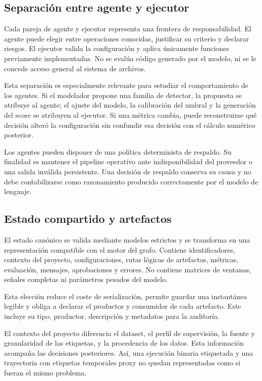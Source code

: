 \subsection{Separación entre agente y ejecutor}

Cada pareja de agente y ejecutor representa una frontera de responsabilidad. El
agente puede elegir entre operaciones conocidas, justificar su criterio y
declarar riesgos. El ejecutor valida la configuración y aplica únicamente
funciones previamente implementadas. No se evalúa código generado por el
modelo, ni se le concede acceso general al sistema de archivos.

Esta separación es especialmente relevante para estudiar el comportamiento de
los agentes. Si el modelador propone una familia de detector, la propuesta se
atribuye al agente; el ajuste del modelo, la calibración del umbral y la
generación del score se atribuyen al ejecutor. Si una métrica cambia, puede
reconstruirse qué decisión alteró la configuración sin confundir esa decisión
con el cálculo numérico posterior.

Los agentes pueden disponer de una política determinista de respaldo. Su
finalidad es mantener el pipeline operativo ante indisponibilidad del proveedor
o una salida inválida persistente. Una decisión de respaldo conserva su causa y
no debe contabilizarse como razonamiento producido correctamente por el modelo
de lenguaje.

\subsection{Estado compartido y artefactos}

El estado canónico se valida mediante modelos estrictos y se transforma en una
representación compatible con el motor del grafo. Contiene identificadores,
contexto del proyecto, configuraciones, rutas lógicas de artefactos, métricas,
evaluación, mensajes, aprobaciones y errores. No contiene matrices de ventanas,
señales completas ni parámetros pesados del modelo.

Esta elección reduce el coste de serialización, permite guardar una instantánea
legible y obliga a declarar el productor y consumidor de cada artefacto. Este
incluye su tipo, productor, descripción y metadatos para la auditoría.

El contexto del proyecto diferencia el dataset, el perfil de supervisión, la
fuente y granularidad de las etiquetas, y la procedencia de los datos. Esta
información acompaña las decisiones posteriores. Así, una ejecución binaria
etiquetada y una trayectoria con etiquetas temporales proxy no quedan
representadas como si fueran el mismo problema.

